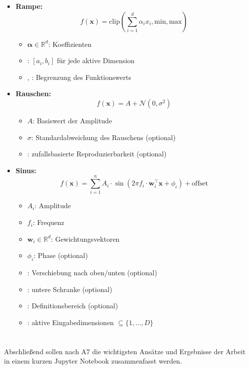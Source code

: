 \begin{otherlanguage}{ngerman}
\begin{itemize}
  \item \textbf{Rampe:}
    \[
    f(\mathbf{x}) = \mathrm{clip}\left( \sum_{i=1}^d \alpha_i x_i, \text{min}, \text{max} \right)
    \]
    \begin{itemize}
      \item $\boldsymbol{\alpha} \in \mathbb{R}^d$: Koeffizienten
      \item {}: $[a_i, b_i]$ für jede aktive Dimension
      \item {}, : Begrenzung des Funktionswerts
    \end{itemize}

  \item \textbf{Rauschen:}
    \[
    f(\mathbf{x}) = A + \mathcal{N}(0, \sigma^2)
    \]
    \begin{itemize}
      \item $A$: Basiswert der Amplitude
      \item $\sigma$: Standardabweichung des Rauschens (optional)
      \item {}: zufallsbasierte Reproduzierbarkeit (optional)
    \end{itemize}

  \item \textbf{Sinus:}
    \[
    f(\mathbf{x}) = \sum_{i=1}^{n} A_i \cdot \sin(2\pi f_i \cdot \mathbf{w}_i^\top \mathbf{x} + \phi_i) + \text{offset}
    \]
    \begin{itemize}
      \item $A_i$: Amplitude
      \item $f_i$: Frequenz
      \item $\mathbf{w}_i \in \mathbb{R}^d$: Gewichtungsvektoren
      \item $\phi_i$: Phase (optional)
      \item {}: Verschiebung nach oben/unten (optional)
      \item {}: untere Schranke (optional)
      \item {}: Definitionsbereich (optional)
      \item {}: aktive Eingabedimensionen $\subseteq \{1, \dots, D\}$
    \end{itemize}
\end{itemize}






\section{}

Abschließend sollen nach A7 die wichtigsten Ansätze und Ergebnisse der Arbeit in einem kurzen Jupyter Notebook zusammenfasst werden. 



\end{otherlanguage}
